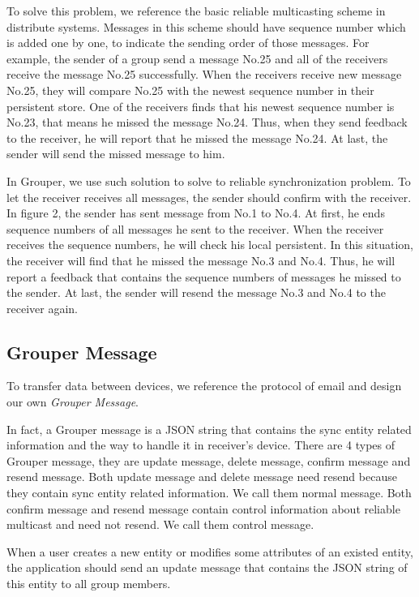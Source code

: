\documentclass[twocolumn,10pt]{article}
\begin{document}
To solve this problem, we reference the basic reliable multicasting scheme in distribute systems. Messages in this scheme should have sequence number which is added one by one, to indicate the sending order of those messages. For example, the sender of a group send a message No.25 and all of the receivers receive the message No.25 successfully. When the receivers receive new message No.25, they will compare No.25 with the newest sequence number in their persistent store. One of the receivers finds that his newest sequence number is No.23, that means he missed the message No.24. Thus, when they send feedback to the receiver, he will report that he missed the message No.24. At last, the sender will send the missed message to him.

In Grouper, we use such solution to solve to reliable synchronization problem. To let the receiver receives all messages, the sender should confirm with the receiver. In figure 2, the sender has sent message from No.1 to No.4. At first, he ends sequence numbers of all messages he sent to the receiver. When the receiver receives the sequence numbers, he will check his local persistent. In this situation, the receiver will find that he missed the message No.3 and No.4. Thus, he will report a feedback that contains the sequence numbers of messages he missed to the sender. At last, the sender will resend the message No.3 and No.4 to the receiver again.

\subsection{Grouper Message}

To transfer data between devices, we reference the protocol of email and design our own \emph{Grouper Message}.

In fact, a Grouper message is a JSON string that contains the sync entity related information and the way to handle it in receiver’s device. There are 4 types of Grouper message, they are update message, delete message, confirm message and resend message. Both update message and delete message need resend because they contain sync entity related information. We call them normal message. Both confirm message and resend message contain control information about reliable multicast and need not resend. We call them control message.

When a user creates a new entity or modifies some attributes of an existed entity, the application should send an update message that contains the JSON string of this entity to all group members.
\end{document}
